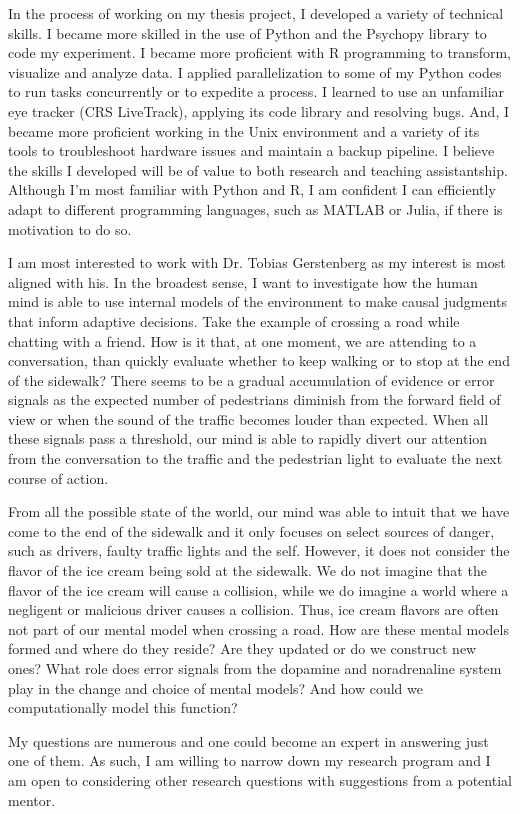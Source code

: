 \documentclass[12pt]{article}
\begin{document}
	In the process of working on my thesis project, I developed a variety of technical skills. I became more skilled in the use of Python and the Psychopy library to code my experiment. I became more proficient with R programming to transform, visualize and analyze data. I applied parallelization to some of my Python codes to run tasks concurrently or to expedite a process. I learned to use an unfamiliar eye tracker (CRS LiveTrack), applying its code library and resolving bugs. And, I became more proficient working in the Unix environment and a variety of its tools to troubleshoot hardware issues and maintain a backup pipeline. I believe the skills I developed will be of value to both research and teaching assistantship. Although I’m most familiar with Python and R, I am confident I can efficiently adapt to different programming languages, such as MATLAB or Julia, if there is motivation to do so.
	
	I am most interested to work with Dr. Tobias Gerstenberg as my interest is most aligned with his. In the broadest sense, I want to investigate how the human mind is able to use internal models of the environment to make causal judgments that inform adaptive decisions. Take the example of crossing a road while chatting with a friend. How is it that, at one moment, we are attending to a conversation, than quickly evaluate whether to keep walking or to stop at the end of the sidewalk? There seems to be a gradual accumulation of evidence or error signals as the expected number of pedestrians diminish from the forward field of view or when the sound of the traffic becomes louder than expected. When all these signals pass a threshold, our mind is able to rapidly divert our attention from the conversation to the traffic and the pedestrian light to evaluate the next course of action.
	
	From all the possible state of the world, our mind was able to intuit that we have come to the end of the sidewalk and it only focuses on select sources of danger, such as drivers, faulty traffic lights and the self. However, it does not consider the flavor of the ice cream being sold at the sidewalk. We do not imagine that the flavor of the ice cream will cause a collision, while we do imagine a world where a negligent or malicious driver causes a collision. Thus, ice cream flavors are often not part of our mental model when crossing a road. How are these mental models formed and where do they reside? Are they updated or do we construct new ones? What role does error signals from the dopamine and noradrenaline system play in the change and choice of mental models? And how could we computationally model this function?

	My questions are numerous and one could become an expert in answering just one of them. As such, I am willing to narrow down my research program and I am open to considering other research questions with suggestions from a potential mentor.
	
\end{document}
